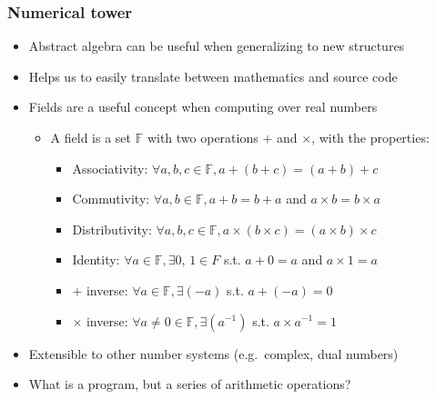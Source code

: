 \documentclass{beamer}
\begin{document}
    \begin{frame}
        \frametitle{Numerical tower}
        \begin{itemize}
            \item Abstract algebra can be useful when generalizing to new structures
            \item Helps us to easily translate between mathematics and source code
            \item Fields are a useful concept when computing over real numbers
            \begin{itemize}
                \item A field is a set $\mathbb{F}$ with two operations $+$ and $\times$, with the properties:
                \begin{itemize}
                    \item Associativity: $\forall a, b, c \in \mathbb{F}, a + (b + c) = (a + b) + c$
                    \item Commutivity: $\forall a, b \in \mathbb{F}, a + b = b + a$ and $a\times b = b\times a$
                    \item Distributivity: $\forall a, b, c \in \mathbb{F}, a \times (b \times c) = (a \times b) \times c$
                    \item Identity: $\forall a \in \mathbb{F}, \exists 0$, $ 1 \in F$ s.t. $a + 0 = a$ and $a\times 1= a$
                    \item $+$ inverse: $\forall a\in \mathbb{F}, \exists (-a)$ s.t. $a + (-a) = 0$
                    \item $\times$ inverse: $\forall a\neq 0 \in \mathbb{F}, \exists (a^{-1})$ s.t. $a \times a^{-1} = 1$
                \end{itemize}
            \end{itemize}
            \item Extensible to other number systems (e.g.\ complex, dual numbers)
            \item What is a program, but a series of arithmetic operations?
        \end{itemize}
    \end{frame}

\end{document}
